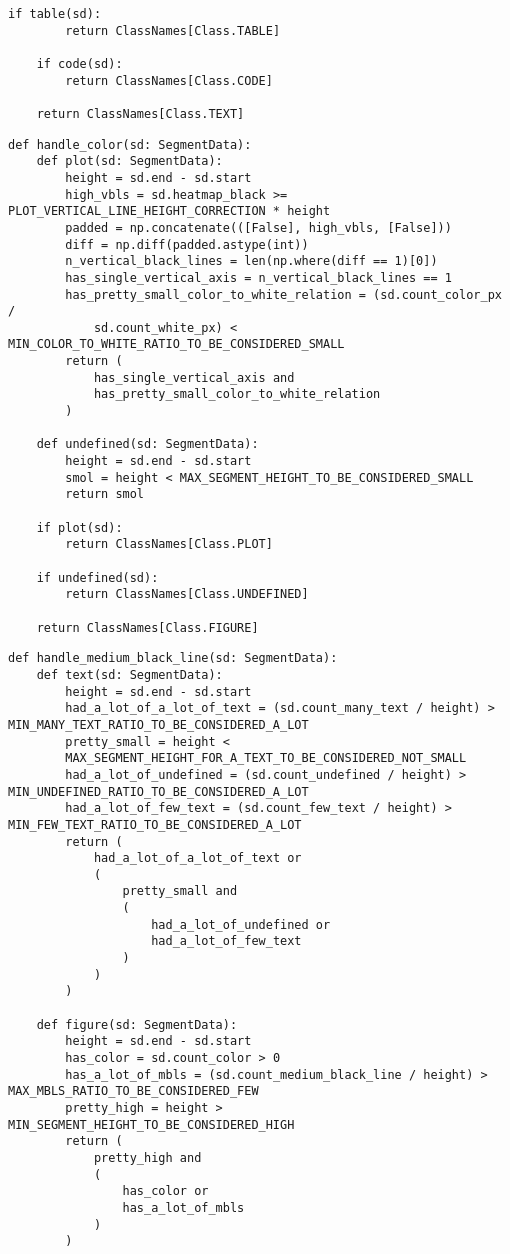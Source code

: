 \begin{lstlisting}[caption={Функция handle\_many\_text (часть 3)}, label={lst:}]
    if table(sd):
        return ClassNames[Class.TABLE]

    if code(sd):
        return ClassNames[Class.CODE]

    return ClassNames[Class.TEXT]
\end{lstlisting}

\begin{lstlisting}[caption={Функция handle\_color}, label={lst:}]
def handle_color(sd: SegmentData):
    def plot(sd: SegmentData):
        height = sd.end - sd.start
        high_vbls = sd.heatmap_black >= PLOT_VERTICAL_LINE_HEIGHT_CORRECTION * height
        padded = np.concatenate(([False], high_vbls, [False]))
        diff = np.diff(padded.astype(int))
        n_vertical_black_lines = len(np.where(diff == 1)[0])
        has_single_vertical_axis = n_vertical_black_lines == 1
        has_pretty_small_color_to_white_relation = (sd.count_color_px /
            sd.count_white_px) < MIN_COLOR_TO_WHITE_RATIO_TO_BE_CONSIDERED_SMALL
        return (
            has_single_vertical_axis and
            has_pretty_small_color_to_white_relation
        )

    def undefined(sd: SegmentData):
        height = sd.end - sd.start
        smol = height < MAX_SEGMENT_HEIGHT_TO_BE_CONSIDERED_SMALL
        return smol

    if plot(sd):
        return ClassNames[Class.PLOT]

    if undefined(sd):
        return ClassNames[Class.UNDEFINED]
    
    return ClassNames[Class.FIGURE]
\end{lstlisting}

\begin{lstlisting}[caption={Функция handle\_medium\_black\_line (часть 1)}, label={lst:}]
def handle_medium_black_line(sd: SegmentData):
    def text(sd: SegmentData):
        height = sd.end - sd.start
        had_a_lot_of_a_lot_of_text = (sd.count_many_text / height) > MIN_MANY_TEXT_RATIO_TO_BE_CONSIDERED_A_LOT
        pretty_small = height <
        MAX_SEGMENT_HEIGHT_FOR_A_TEXT_TO_BE_CONSIDERED_NOT_SMALL
        had_a_lot_of_undefined = (sd.count_undefined / height) > MIN_UNDEFINED_RATIO_TO_BE_CONSIDERED_A_LOT
        had_a_lot_of_few_text = (sd.count_few_text / height) > MIN_FEW_TEXT_RATIO_TO_BE_CONSIDERED_A_LOT
        return (
            had_a_lot_of_a_lot_of_text or
            (
                pretty_small and
                (
                    had_a_lot_of_undefined or
                    had_a_lot_of_few_text
                )
            )
        )

    def figure(sd: SegmentData):
        height = sd.end - sd.start
        has_color = sd.count_color > 0
        has_a_lot_of_mbls = (sd.count_medium_black_line / height) > MAX_MBLS_RATIO_TO_BE_CONSIDERED_FEW
        pretty_high = height > MIN_SEGMENT_HEIGHT_TO_BE_CONSIDERED_HIGH
        return (
            pretty_high and
            (
                has_color or
                has_a_lot_of_mbls
            )
        )
\end{lstlisting}

